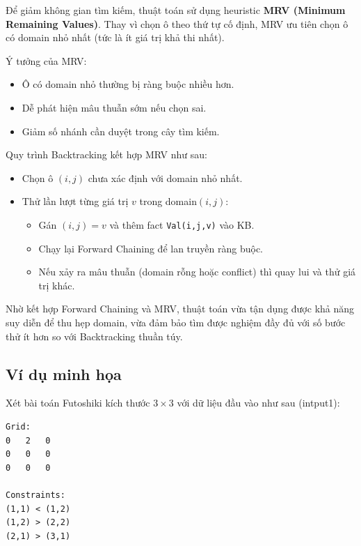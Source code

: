 Để giảm không gian tìm kiếm, thuật toán sử dụng heuristic \textbf{MRV (Minimum Remaining Values)}. Thay vì chọn ô theo thứ tự cố định, MRV ưu tiên chọn ô có domain nhỏ nhất (tức là ít giá trị khả thi nhất).

Ý tưởng của MRV:
\begin{itemize}
    \item Ô có domain nhỏ thường bị ràng buộc nhiều hơn.
    \item Dễ phát hiện mâu thuẫn sớm nếu chọn sai.
    \item Giảm số nhánh cần duyệt trong cây tìm kiếm.
\end{itemize}

Quy trình Backtracking kết hợp MRV như sau:

\begin{itemize}
    \item Chọn ô $(i,j)$ chưa xác định với domain nhỏ nhất.
    \item Thử lần lượt từng giá trị $v$ trong domain$(i,j)$:
    \begin{itemize}
        \item Gán $(i,j) = v$ và thêm fact \texttt{Val(i,j,v)} vào KB.
        \item Chạy lại Forward Chaining để lan truyền ràng buộc.
        \item Nếu xảy ra mâu thuẫn (domain rỗng hoặc conflict) thì quay lui và thử giá trị khác.
    \end{itemize}
\end{itemize}

Nhờ kết hợp Forward Chaining và MRV, thuật toán vừa tận dụng được khả năng suy diễn để thu hẹp domain, vừa đảm bảo tìm được nghiệm đầy đủ với số bước thử ít hơn so với Backtracking thuần túy.

\subsection{Ví dụ minh họa}

Xét bài toán Futoshiki kích thước $3 \times 3$ với dữ liệu đầu vào như sau (intput1):

\begin{tcolorbox}[colback=gray!5, colframe=black, title=Ví dụ 3x3]
\begin{verbatim}
Grid:
0   2   0
0   0   0
0   0   0

Constraints:
(1,1) < (1,2)
(1,2) > (2,2)
(2,1) > (3,1)
\end{verbatim}
\end{tcolorbox}

